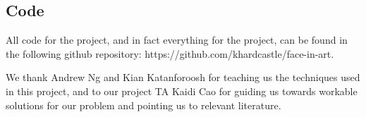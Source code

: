 \documentclass{pnastwo2}
\begin{document}
\begin{article}
\section{Code}

All code for the project, and in fact everything for the project, can be found in the following github repository: https://github.com/khardcastle/face-in-art.


\begin{acknowledgments}
We thank Andrew Ng and Kian Katanforoosh for teaching us the techniques used in this project, and to our project TA Kaidi Cao for guiding us towards workable solutions for our problem and pointing us to relevant literature.
\end{acknowledgments}





\end{article}
\end{document}
